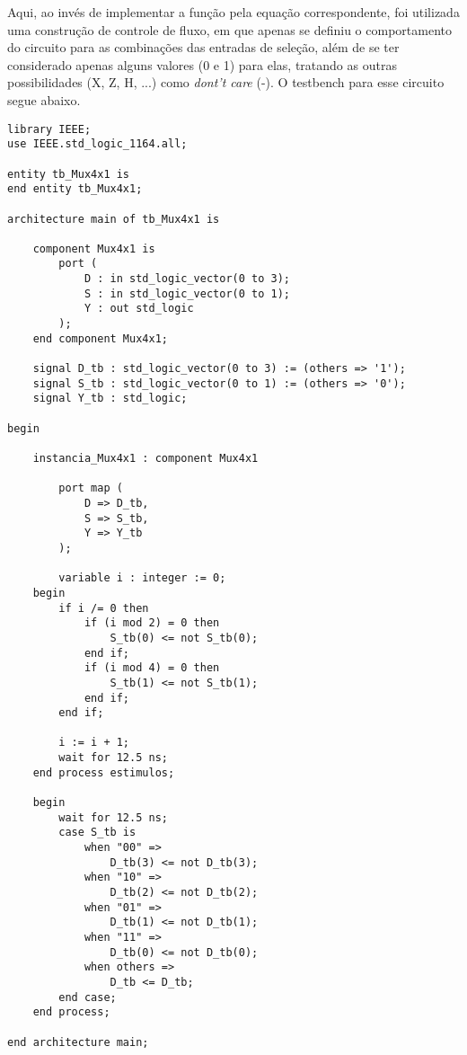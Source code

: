\documentclass[a4paper,12pt]{article}
\newenvironment{code}{\captionsetup{type=listing}}{}
\begin{document}
Aqui, ao invés de implementar a função pela equação correspondente, foi utilizada uma construção de controle de fluxo, em que apenas se definiu o comportamento do circuito para as combinações das entradas de seleção, além de se ter considerado apenas alguns valores (0 e 1) para elas, tratando as outras possibilidades (X, Z, H, ...) como \textit{dont't care} (-). O testbench para esse circuito segue abaixo.

\begin{code}
\begin{verbatim}
library IEEE;
use IEEE.std_logic_1164.all;

entity tb_Mux4x1 is
end entity tb_Mux4x1;

architecture main of tb_Mux4x1 is
    
    component Mux4x1 is
        port (
            D : in std_logic_vector(0 to 3);
            S : in std_logic_vector(0 to 1);
            Y : out std_logic
        );
    end component Mux4x1;
    
    signal D_tb : std_logic_vector(0 to 3) := (others => '1');
    signal S_tb : std_logic_vector(0 to 1) := (others => '0');
    signal Y_tb : std_logic;

begin
    
    instancia_Mux4x1 : component Mux4x1

        port map (
            D => D_tb,
            S => S_tb,
            Y => Y_tb
        );
        
        variable i : integer := 0;
    begin
        if i /= 0 then
            if (i mod 2) = 0 then
                S_tb(0) <= not S_tb(0);
            end if;
            if (i mod 4) = 0 then
                S_tb(1) <= not S_tb(1);
            end if;
        end if;

        i := i + 1;
        wait for 12.5 ns;
    end process estimulos;

    begin
        wait for 12.5 ns;
        case S_tb is
            when "00" =>
                D_tb(3) <= not D_tb(3);
            when "10" =>
                D_tb(2) <= not D_tb(2);
            when "01" =>
                D_tb(1) <= not D_tb(1);
            when "11" =>
                D_tb(0) <= not D_tb(0);
            when others =>
                D_tb <= D_tb;
        end case;
    end process;
    
end architecture main;
\end{verbatim}
\vspace{10pt}
\end{code}
\end{document}
